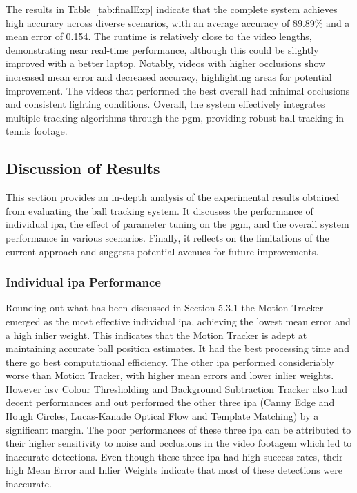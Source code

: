 \documentclass[12pt,a4paper]{article}
\begin{document}
The results in Table~\ref{tab:finalExp} indicate that the complete system achieves high accuracy across diverse scenarios, with an average accuracy of 89.89\% and a mean error of 0.154. The runtime is relatively close to the video lengths, demonstrating near real-time performance, although this could be slightly improved with a better laptop. Notably, videos with higher occlusions show increased mean error and decreased accuracy, highlighting areas for potential improvement. The videos that performed the best overall had minimal occlusions and consistent lighting conditions. Overall, the system effectively integrates multiple tracking algorithms through the \acs{pgm}, providing robust ball tracking in tennis footage.

\subsection{Discussion of Results}
This section provides an in-depth analysis of the experimental results obtained from evaluating the ball tracking system. It discusses the performance of individual \acs{ipa}, the effect of parameter tuning on the \acs{pgm}, and the overall system performance in various scenarios. Finally, it reflects on the limitations of the current approach and suggests potential avenues for future improvements.

\subsubsection{Individual \acs{ipa} Performance}
Rounding out what has been  discussed in Section 5.3.1 the Motion Tracker emerged as the most effective individual \acs{ipa}, achieving the lowest mean error and a high inlier weight. This indicates that the Motion Tracker is adept at maintaining accurate ball position estimates. It had the best processing time and there go best computational efficiency. The other \acs{ipa} performed consideriably worse than Motion Tracker, with higher mean errors and lower inlier weights. However \acs{hsv} Colour Thresholding and Background Subtraction Tracker also had decent performances and out performed the other three \acs{ipa} (Canny Edge and Hough Circles, Lucas-Kanade Optical Flow and Template Matching) by a significant margin. The poor performances of these three \acs{ipa} can be attributed to their higher sensitivity to noise and occlusions in the video footagem which led to inaccurate detections. Even though these three \acs{ipa} had high success rates, their high Mean Error and Inlier Weights indicate that most of these detections were inaccurate.
\end{document}
